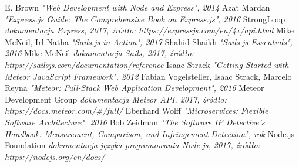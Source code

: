 \documentclass[12pt]{report}
\begin{document}
\begin{thebibliography}{99}
E. Brown
\textit{"Web Development with Node and Express", 2014}
Azat Mardan
\textit{"Express.js Guide: The Comprehensive Book on Express.js", 2016}
StrongLoop
\textit{dokumentacja Express, 2017, źródło: https://expressjs.com/en/4x/api.html}
Mike McNeil, Irl Natha
\textit{"Sails.js in Action", 2017}
Shahid Shaikh
\textit{"Sails.js Essentials", 2016}
Mike McNeil
\textit{dokumentacja Sails, 2017, źródło: https://sailsjs.com/documentation/reference}
Isaac Strack
\textit{"Getting Started with Meteor JavaScript Framework", 2012}
Fabian Vogelsteller, Isaac Strack, Marcelo Reyna
\textit{"Meteor: Full-Stack Web Application Development", 2016}
Meteor Development Group
\textit{dokumentacja Meteor API, 2017, źródło: https://docs.meteor.com/#/full/}
Eberhard Wolff
\textit{"Microservices: Flexible Software Architecture", 2016}
Bob Zeidman
\textit{"The Software IP Detective's Handbook: Measurement, Comparison, and Infringement Detection", rok}
Node.js Foundation
\textit{dokumentacja języka programowania Node.js, 2017, źródło: https://nodejs.org/en/docs/}
\end{thebibliography}
\listoffigures
\end{document}
